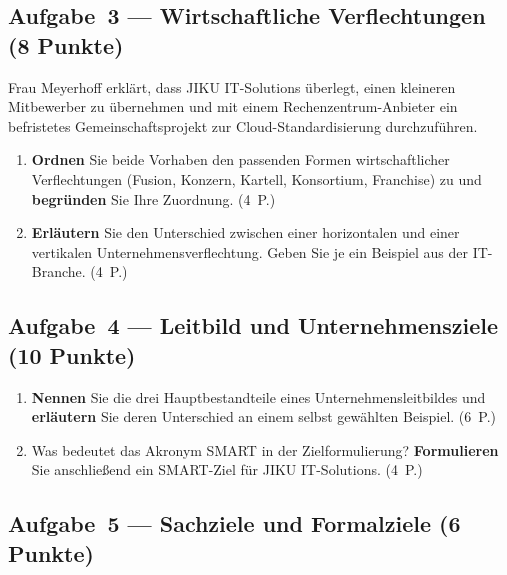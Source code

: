 \documentclass[11pt, a4paper]{article}
\begin{document}
\bigskip

\subsection*{Aufgabe~3 --- Wirtschaftliche Verflechtungen (8 Punkte)}

Frau Meyerhoff erklärt, dass JIKU IT-Solutions überlegt, einen kleineren Mitbewerber zu übernehmen
und mit einem Rechenzentrum-Anbieter ein befristetes Gemeinschaftsprojekt zur Cloud-Standardisierung
durchzuführen.

\begin{enumerate}[label=(\alph*)]
  \item \textbf{Ordnen} Sie beide Vorhaben den passenden Formen wirtschaftlicher Verflechtungen
  (Fusion, Konzern, Kartell, Konsortium, Franchise) zu und \textbf{begründen} Sie Ihre Zuordnung. \hfill (4~P.)

  \vspace{5cm}

  \item \textbf{Erläutern} Sie den Unterschied zwischen einer horizontalen und einer vertikalen
  Unternehmensverflechtung. Geben Sie je ein Beispiel aus der IT-Branche. \hfill (4~P.)

  \vspace{5cm}
\end{enumerate}

\subsection*{Aufgabe~4 --- Leitbild und Unternehmensziele (10 Punkte)}

\begin{enumerate}[label=(\alph*)]
  \item \textbf{Nennen} Sie die drei Hauptbestandteile eines Unternehmensleitbildes und
  \textbf{erläutern} Sie deren Unterschied an einem selbst gewählten Beispiel. \hfill (6~P.)

  \vspace{6cm}

  \item Was bedeutet das Akronym SMART in der Zielformulierung? \textbf{Formulieren} Sie
  anschließend ein SMART-Ziel für JIKU IT-Solutions. \hfill (4~P.)

  \vspace{5cm}
\end{enumerate}

\subsection*{Aufgabe~5 --- Sachziele und Formalziele (6 Punkte)}
\end{document}
